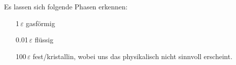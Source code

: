 Es lassen sich folgende Phasen erkennen:
\begin{enumerate}
\item[1$\,\varepsilon$] gasförmig \\
\item[0.01$\,\varepsilon$] flüssig \\
\item[100$\,\varepsilon$] fest/kristallin, wobei uns das physikalisch nicht sinnvoll erscheint.\\
\end{enumerate}
\begin{comment}
\newpage
\begin{landscape}
	\begin{figure}
		\OverfullCenter{\texttt{[image: ../A1/A3\_savedata.pdf]}}
		\caption{Graphische Darstellung der Ergebnisse von Aufgabe 1d: Plots der Energien ($T_0$ = 1$\,\varepsilon$)}
		\label{fig:energie1}
	\end{figure}
\end{landscape} 

\begin{landscape}
	\begin{figure}
		\OverfullCenter{\texttt{[image: ../A1/A3\_paar.pdf]}}
		\caption{Graphische Darstellung der Ergebnisse von Aufgabe 1d: Plots der Paarkorrelationsfunktion ($T_0$ = 1$\,\varepsilon$)}
		\label{fig:korr1}
	\end{figure}
\end{landscape} 

\begin{landscape}
	\begin{figure}
		\OverfullCenter{\texttt{[image: ../A1/A3\_savedata.pdf]}}
		\caption{Graphische Darstellung der Ergebnisse von Aufgabe 1d: Plots der Energien ($T_0$ = 0.01$\,\varepsilon$)}
		\label{fig:energie2}
	\end{figure}
\end{landscape} 

\begin{landscape}
	\begin{figure}
		\OverfullCenter{\texttt{[image: ../A1/A3\_paar.pdf]}}
		\caption{Graphische Darstellung der Ergebnisse von Aufgabe 1d: Plots der Paarkorrelationsfunktion($T_0$ = 0.01$\,\varepsilon$)}
		\label{fig:korr2}
	\end{figure}
\end{landscape} 

\begin{landscape}
	\begin{figure}
		\OverfullCenter{\texttt{[image: ../A1/A3\_savedata.pdf]}}
		\caption{Graphische Darstellung der Ergebnisse von Aufgabe 1d: Plots der Energien($T_0$ = 100$\,\varepsilon$)}
		\label{fig:energie3}
	\end{figure}
\end{landscape} 


\end{comment}
